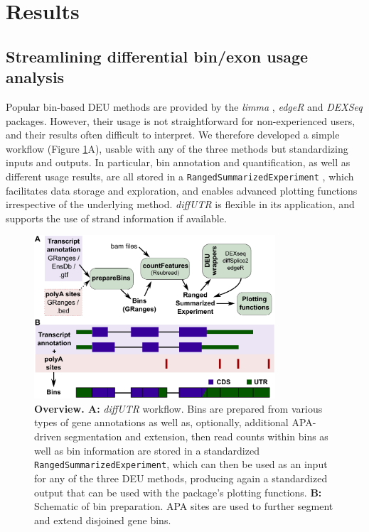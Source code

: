 \documentclass{bmcart}
\begin{document}
\section*{Results}
\subsection*{Streamlining differential bin/exon usage analysis}

Popular bin-based DEU methods are provided by the \textit{limma} \cite{Ritchie2015LimmaStudies, Law2014Voom:Counts}, \textit{edgeR} \cite{Robinson2009EdgeR:Data} and \textit{DEXSeq} \cite{Anders2012DetectingData} packages. However, their usage is not straightforward for non-experienced users, and their results often difficult to interpret. We therefore developed a simple workflow (Figure \ref{fig:scheme}A), usable with any of the three methods but standardizing inputs and outputs. In particular, bin annotation and quantification, as well as different usage results, are all stored in a \texttt{RangedSummarizedExperiment} \cite{Morgan2018SummarizedExperiment:Container}, which facilitates data storage and exploration, and enables advanced plotting functions irrespective of the underlying method. \textit{diffUTR} is flexible in its application, and supports the use of strand information if available.

\begin{figure}[h]
\includegraphics[width=0.8\textwidth]{figure1.pdf}
\caption{\textbf{Overview. A:} \textit{diffUTR} workflow. Bins are prepared from various types of gene annotations as well as, optionally, additional APA-driven segmentation and extension, then read counts within bins as well as bin information are stored in a standardized \texttt{RangedSummarizedExperiment}, which can then be used as an input for any of the three DEU methods, producing again a standardized output that can be used with the package's plotting functions. \textbf{B:} Schematic of bin preparation. APA sites are used to further segment and extend disjoined gene bins.}
\label{fig:scheme}
\end{figure}
\end{document}
